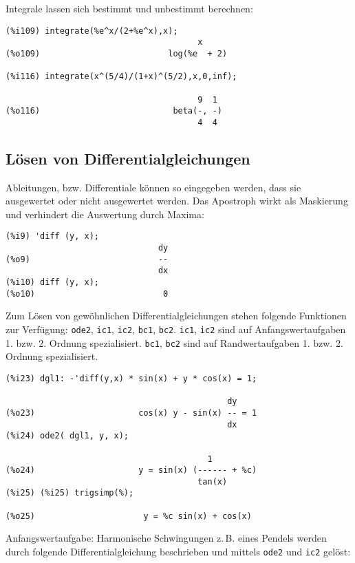 \documentclass[12pt]{scrartcl}
\newcommand*\zB{z.\,B.\xspace}
\begin{document}
Integrale lassen sich bestimmt und unbestimmt berechnen:

\begin{verbatim}
(%i109) integrate(%e^x/(2+%e^x),x);
                                       x
(%o109)                          log(%e  + 2)

(%i116) integrate(x^(5/4)/(1+x)^(5/2),x,0,inf);

                                       9  1
(%o116)                           beta(-, -)
                                       4  4
\end{verbatim}

\subsection{Lösen von Differentialgleichungen}

Ableitungen, bzw. Differentiale können so eingegeben werden, dass sie
ausgewertet oder nicht ausgewertet werden.  Das Apostroph wirkt als
Maskierung und verhindert die Auswertung durch Maxima:

\begin{verbatim}
(%i9) 'diff (y, x);
                               dy
(%o9)                          --
                               dx
(%i10) diff (y, x);
(%o10)                          0
\end{verbatim}

Zum Lösen von gewöhnlichen Differentialgleichungen stehen folgende
Funktionen zur Verfügung: \texttt{ode2}, \texttt{ic1}, \texttt{ic2}, \texttt{bc1}, \texttt{bc2}.
\texttt{ic1}, \texttt{ic2} sind auf Anfangswertaufgaben 1. bzw. 2. Ordnung spezialisiert.
\texttt{bc1}, \texttt{bc2} sind auf Randwertaufgaben 1. bzw. 2. Ordnung spezialisiert.

\begin{verbatim}
(%i23) dgl1: -'diff(y,x) * sin(x) + y * cos(x) = 1;

                                             dy
(%o23)                     cos(x) y - sin(x) -- = 1
                                             dx
(%i24) ode2( dgl1, y, x);

                                         1
(%o24)                     y = sin(x) (------ + %c)
                                       tan(x)
(%i25) (%i25) trigsimp(%);

(%o25)                      y = %c sin(x) + cos(x)
\end{verbatim}

Anfangswertaufgabe: Harmonische Schwingungen \zB eines Pendels
werden durch folgende Differentialgleichung beschrieben und mittels
\texttt{ode2} und \texttt{ic2} gelöst:
\end{document}

